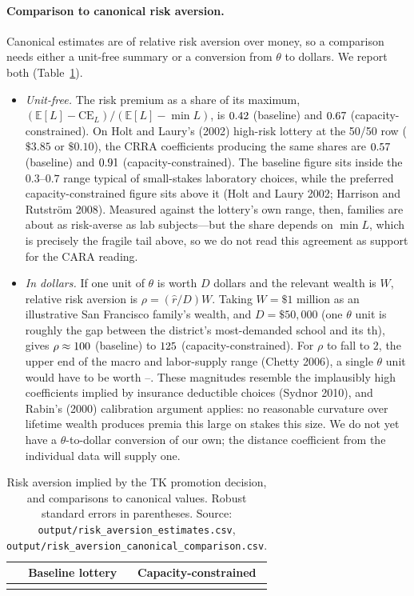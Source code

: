 \documentclass{article}
\begin{document}
\paragraph{Comparison to canonical risk aversion.} Canonical estimates are of relative risk aversion over money, so a comparison needs either a unit-free summary or a conversion from $\theta$ to dollars. We report both (Table~\ref{tab:canonical}).
\begin{itemize}
    \item \emph{Unit-free.} The risk premium as a share of its maximum, $(\mathbb{E}[L] - \mathrm{CE}_L) / (\mathbb{E}[L] - \min L)$, is $0.42$ (baseline) and $0.67$ (capacity-constrained). On Holt and Laury's (2002) high-risk lottery at the 50/50 row ($\$3.85$ or $\$0.10$), the CRRA coefficients producing the same shares are $0.57$ (baseline) and $0.91$ (capacity-constrained). The baseline figure sits inside the $0.3$--$0.7$ range typical of small-stakes laboratory choices, while the preferred capacity-constrained figure sits above it (Holt and Laury 2002; Harrison and Rutstr\"om 2008). Measured against the lottery's own range, then, families are about as risk-averse as lab subjects---but the share depends on $\min L$, which is precisely the fragile tail above, so we do not read this agreement as support for the CARA reading.
    \item \emph{In dollars.} If one unit of $\theta$ is worth $D$ dollars and the relevant wealth is $W$, relative risk aversion is $\rho = (\hat r / D) W$. Taking $W = \$1$ million as an illustrative San Francisco family's wealth, and $D = \$50{,}000$ (one $\theta$ unit is roughly the gap between the district's most-demanded school and its \numOneUnitRank{}th), gives $\rho \approx 100$ (baseline) to $125$ (capacity-constrained). For $\rho$ to fall to $2$, the upper end of the macro and labor-supply range (Chetty 2006), a single $\theta$ unit would have to be worth \numBreakevenBase--\numBreakevenCap. These magnitudes resemble the implausibly high coefficients implied by insurance deductible choices (Sydnor 2010), and Rabin's (2000) calibration argument applies: no reasonable curvature over lifetime wealth produces premia this large on stakes this size. We do not yet have a $\theta$-to-dollar conversion of our own; the distance coefficient from the individual data will supply one.
\end{itemize}

\begin{table}
\centering
\small
\begin{tabular}{lcc}
 & Baseline lottery & Capacity-constrained \\ \hline
{}{risk_aversion}
\end{tabular}
\caption{Risk aversion implied by the TK promotion decision, and comparisons to canonical values. Robust standard errors in parentheses. Source: \texttt{output/risk\_aversion\_estimates.csv}, \texttt{output/risk\_aversion\_canonical\_comparison.csv}.}
\label{tab:canonical}
\end{table}
\end{document}
